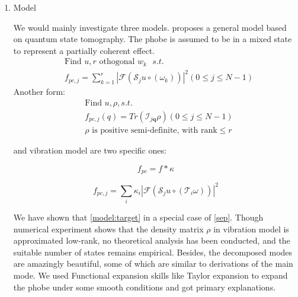 \documentclass{article}
\numberwithin{equation}{section}
\begin{document}
\begin{enumerate}[leftmargin=*]

\item Model 

We would mainly investigate three models. \cite{mix} proposes a general model based on quantum state tomography. The phobe is assumed to be in a mixed state to represent a partially coherent effect.
\begin{equation}
\label{sep} 
\begin{aligned}
&\mbox{Find } u, r \mbox{ othogonal $w_k$   }s.t. \\
&f_{p c, j}=\sum_{k=1}^r \left|\mathcal{F}\left( \mathcal{S}_{j} u \circ \left(\omega_k\right) \right)\right|^{2} (0\leq j \leq N-1)
\end{aligned}
\end{equation}
Another form:
\begin{equation}
\label{lift}
\begin{aligned}
&\mbox{Find } u,\rho,s.t.\\
&f_{pc,j}(q) = Tr(\mathcal{I}_{j \mathbf{q}} \rho ) (0\leq j \leq N-1)\\
&\rho \mbox{ is positive semi-definite, with rank}\leq r 
\end{aligned}
\end{equation}

 \cite{psf} and vibration model \cite{chang} are two specific ones:
 
 \begin{equation}
 \label{simple}
     f_{p c}=f * \kappa
 \end{equation}
 
 \begin{equation}
 f_{p c, j}=\sum_{i} \kappa_{i}\left|\mathcal{F}\left( \mathcal{S}_{j} u \circ \left(\mathcal{T}_{i} \omega\right) \right)\right|^{2}
 \label{model:target}
 \end{equation}
 

We have shown that \ref{model:target} in a special case of \ref{sep}. Though numerical experiment shows that the density matrix $\rho$ in vibration model is approximated low-rank, no theoretical analysis has been conducted, and the suitable number of states remains empirical. Besides, the decomposed modes are amazingly beautiful, some of which are similar to derivations of the main mode. We used Functional expansion skills like Taylor expansion to expand the phobe under some smooth conditions and got primary explanations.  


\begin{figure}[H]
\centering


\end{figure}
\end{enumerate}
\end{document}
